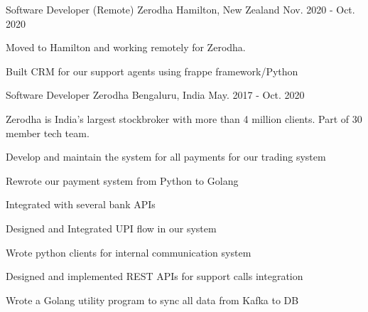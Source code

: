 

\begin{cvexperiences}

    \cvexperience
    {Software Developer (Remote)} %
    {Zerodha} %
    {Hamilton, New Zealand} %
    {Nov. 2020 - Oct. 2020} %
    {\begin{cvparagraph} %
      Moved to Hamilton and working remotely for Zerodha.
\end{cvparagraph}
}    
   { \begin{cvitems} %
      \item {Built CRM for our support agents using frappe framework/Python}
    \end{cvitems}
}



  \cvexperience
    {Software Developer} %
    {Zerodha} %
    {Bengaluru, India} %
    {May. 2017 - Oct. 2020} %
    {\begin{cvparagraph} %
      Zerodha is India's largest stockbroker with more than 4 million clients. Part of 30 member tech team.
\end{cvparagraph}
}    {
      \begin{cvitems} %
        \item {Develop and maintain the system for all payments for our trading system}
        \item {Rewrote our payment system from Python to Golang}
        \item{Integrated with several bank APIs}
        \item{Designed and Integrated UPI flow in our system}
        \item{Wrote python clients for internal communication system}
        \item{Designed and implemented REST APIs for support calls integration}
        \item {Wrote a Golang utility program to sync all data from Kafka to DB}
      \end{cvitems}
    }


\end{cvexperiences}
